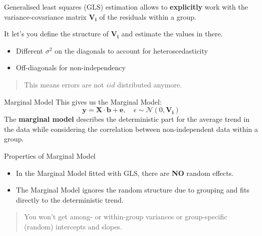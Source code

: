 \documentclass{beamer}
\begin{document}
\begin{frame}{}
  Generalised least squares (GLS) estimation allows to \textbf{explicitly} work with the variance-covariance matrix $\mathbf{V_i}$ of the residuals within a group.
  \vspace{0.5cm}
  
  It let's you define the structure of $\mathbf{V_i}$ and estimate the values in there.
  \vspace{0.5cm}
  
  \begin{itemize}
    \item Different $\sigma^2$ on the diagonals to account for heteroscedasticity
    \item Off-diagonals for non-independency
  \end{itemize}
  \vspace{0.5cm}
  
  \begin{quote}
    This means errors are not $iid$ distributed anymore.
  \end{quote}
\end{frame}


\begin{frame}{Marginal Model}
  This gives us the Marginal Model:
  \[
  \mathbf{y} = \mathbf{X} \cdot \mathbf{b} + \mathbf{e}, \quad \epsilon \sim \mathcal{N}(0, \mathbf{V_i})
  \]
  The \textbf{marginal model} describes the deterministic part for the average trend in the data while considering the correlation between non-independent data within a group.
\end{frame}

\begin{frame}{Properties of Marginal Model}
  \begin{itemize}
    \item In the Marginal Model fitted with GLS, there are \textbf{NO} random effects.
    \item The Marginal Model ignores the random structure due to grouping and fits directly to the deterministic trend.
  \end{itemize}
  \vspace{0.5cm}
  
  \begin{quote}
    You won't get among- or within-group variances or group-specific (random) intercepts and slopes.
  \end{quote}
\end{frame}
\end{document}
